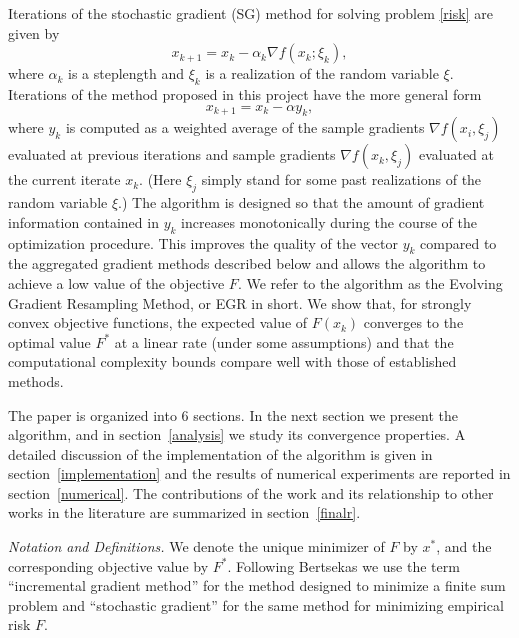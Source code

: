 \documentclass[11pt]{article}
\begin{document}
Iterations of the stochastic gradient (SG) method for solving problem \eqref{risk} are given by 
\begin{equation}   \label{sgdm}
 x_{k+1} = x_k- \alpha_k  \nabla f(x_k; \xi_k), 
 \end{equation}
where $\alpha_k$ is a steplength and $\xi_k$ is a realization of the random variable $\xi$. Iterations of the method proposed in this project have the more general form
\begin{equation}   \label{iteration}
   	 x_{k+1} = x_k  - \alpha  y_k ,
\end{equation}
where $y_k$ is computed as a weighted average of the sample gradients $\nabla f(x_i, \xi_j)$ evaluated at previous iterations and sample gradients $\nabla f(x_k, \xi_j)$ evaluated at the current iterate $x_k$. (Here $\xi_j$ simply stand for some past realizations of the random variable $\xi$.) The algorithm is designed so that the amount of gradient information contained in $y_k$ increases monotonically during the course of the optimization procedure. This improves the quality of the vector $y_k$ compared to the aggregated gradient methods described below and allows the algorithm to achieve a low  value of the objective $F$. We refer to the algorithm as the Evolving Gradient Resampling Method, or EGR in short. We show that, for strongly convex objective functions, the expected value of $F(x_k)$ converges to the optimal value  $F^\ast$ at a linear rate (under some assumptions) and that the computational complexity bounds compare well with those of established methods.  

The paper is organized into 6 sections. In the next section we present the algorithm, and in section~\ref{analysis} we study its convergence properties. A detailed discussion of the implementation of the algorithm is given in section~\ref{implementation} and the results of numerical experiments are reported in section~\ref{numerical}. The contributions of the work and its relationship to other works in the literature are summarized in section~\ref{finalr}.

\bigskip\noindent
\textit{Notation and Definitions.} We denote the unique minimizer of $F$ by $x^\ast$, and the corresponding objective value by $F^\ast$.  Following Bertsekas \cite{bertsekas2011incremental} we use the  term ``incremental gradient method''  for the method designed to minimize a finite sum problem and  ``stochastic gradient'' for the same method for minimizing empirical risk $F$.
\end{document}
